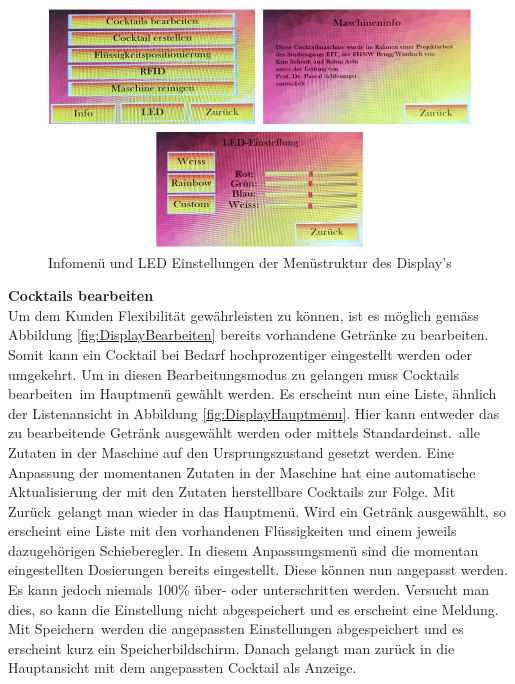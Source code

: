 \begin{figure}[H]
	\centering
	\includegraphics[width=\textwidth]{graphics/DisplayInfoLed}
	\caption{Infomenü und LED Einstellungen der Menüstruktur des Display's}
	\label{fig:DisplayInfoLed}
\end{figure}

\textbf{Cocktails bearbeiten}\\
Um dem Kunden Flexibilität gewährleisten zu können, ist es möglich gemäss Abbildung \ref{fig:DisplayBearbeiten} bereits vorhandene Getränke zu bearbeiten. Somit kann ein Cocktail bei Bedarf hochprozentiger eingestellt werden oder umgekehrt. Um in diesen Bearbeitungsmodus zu gelangen muss \flqq Cocktails bearbeiten\frqq~im Hauptmenü gewählt werden. Es erscheint nun eine Liste, ähnlich der Listenansicht in Abbildung \ref{fig:DisplayHauptmenu}. Hier kann entweder das zu bearbeitende Getränk ausgewählt werden oder mittels \flqq Standardeinst.\frqq~alle Zutaten in der Maschine auf den Ursprungszustand gesetzt werden. Eine Anpassung der momentanen Zutaten in der Maschine hat eine automatische Aktualisierung der mit den Zutaten herstellbare Cocktails zur Folge. Mit \flqq Zurück\frqq~gelangt man wieder in das Hauptmenü. Wird ein Getränk ausgewählt, so erscheint eine Liste mit den vorhandenen Flüssigkeiten und einem jeweils dazugehörigen Schieberegler. In diesem Anpassungsmenü sind die momentan eingestellten Dosierungen bereits eingestellt. Diese können nun angepasst werden. Es kann jedoch niemals 100\% über- oder unterschritten werden. Versucht man dies, so kann die Einstellung nicht abgespeichert und es erscheint eine Meldung. Mit \flqq Speichern\frqq~werden die angepassten Einstellungen abgespeichert und es erscheint kurz ein Speicherbildschirm. Danach gelangt man zurück in die Hauptansicht mit dem angepassten Cocktail als Anzeige.

